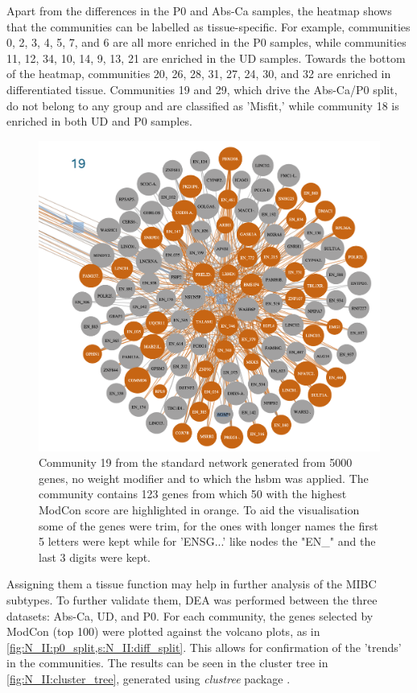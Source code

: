 Apart from the differences in the P0 and Abs-Ca samples, the heatmap shows that the communities can be labelled as tissue-specific. For example, communities 0, 2, 3, 4, 5, 7, and 6 are all more enriched in the P0 samples, while communities 11, 12, 34, 10, 14, 9, 13, 21 are enriched in the UD samples. Towards the bottom of the heatmap, communities 20, 26, 28, 31, 27, 24, 30, and 32 are enriched in differentiated tissue. Communities 19 and 29, which drive the Abs-Ca/P0 split, do not belong to any group and are classified as 'Misfit,' while community 18 is enriched in both UD and P0 samples.


\begin{figure}[H]    
    \centering
    \includegraphics[width=1.0\textwidth,height=1.0\textheight,keepaspectratio]{Sections/Network_II/resources/non_tum/19_com.png}
    \caption{Community 19 from the standard network generated from 5000 genes, no weight modifier and to which the \acrshort{hsbm} was applied. The community contains 123 genes from which 50 with the highest ModCon score are highlighted in orange. To aid the visualisation some of the genes were trim, for the ones with longer names the first 5 letters were kept while for 'ENSG...' like nodes the "EN\_" and the last 3 digits were kept. }
    \label{fig:N_II:19_com}
\end{figure}

Assigning them a tissue function may help in further analysis of the MIBC subtypes. To further validate them, DEA was performed between the three datasets: Abs-Ca, UD, and P0. For each community, the genes selected by ModCon (top 100) were plotted against the volcano plots, as in \cref{fig:N_II:p0_split,s:N_II:diff_split}. This allows for confirmation of the 'trends' in the communities. The results can be seen in the cluster tree in \cref{fig:N_II:cluster_tree}, generated using \textit{clustree} package \cite{Zappia2018-bt}.

